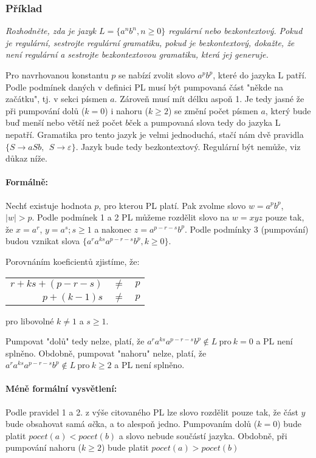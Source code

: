 \documentclass{article}
\begin{document}
\subsubsection{Příklad}
\emph{Rozhodněte, zda je jazyk $L = \{a^nb^n, n\geq0 \}$ regulární nebo bezkontextový.
Pokud je regulární, sestrojte regulární gramatiku, pokud je bezkontextový, dokažte, že není regulární a sestrojte bezkontextovou gramatiku, která jej generuje.}

Pro navrhovanou konstantu $p$ se nabízí zvolit slovo $a^pb^p$, které do jazyka L patří.
Podle podmínek daných v definici PL musí být pumpovaná část "někde na začátku", tj. v sekci písmen $a$.
Zároveň musí mít délku aspoň 1.
Je tedy jasné že při pumpování dolů ($k=0$) i nahoru ($k \geq 2$) se změní počet písmen $a$, který bude buď menší nebo větší než počet $b$ček a pumpovaná slova tedy do jazyka L nepatří.
Gramatika pro tento jazyk je velmi jednoduchá, stačí nám dvě pravidla $\{S \rightarrow aSb,~~ S \rightarrow \varepsilon\}$.
Jazyk bude tedy bezkontextový. Regulární být nemůže, viz důkaz níže.

\paragraph{Formálně:}

Nechť existuje hodnota $p$, pro kterou PL platí.
Pak zvolme slovo $w = a^pb^p$, $|w| > p$.
Podle podmínek 1 a 2 PL můžeme rozdělit slovo na $w = xyz$ pouze tak, že $x=a^r$, $y = a^s; s \geq 1$ a nakonec $z=a^{p-r-s}b^{p}$.
Podle podmínky 3 (pumpování) budou vznikat slova $\{a^ra^{ks}a^{p-r-s}b^{p}, k\geq 0\}$.

Porovnáním koeficientů zjistíme, že:

\begin{tabular}{rcl}
$r+ks+(p-r-s)$  &  $\neq$  &  $p$\\
$p + (k-1)s$  &  $\neq$  &  $p$\\
\end{tabular}   pro libovolné $k \neq 1$ a $s \geq 1$.

Pumpovat "dolů" tedy nelze, platí, že $a^ra^{ks}a^{p-r-s}b^{p} \notin L \ \text{pro}\ k=0$ a PL není splněno.
Obdobně, pumpovat "nahoru" nelze, platí, že $a^ra^{ks}a^{p-r-s}b^{p} \notin L \ \text{pro}\ k\geq2$ a PL není splněno.

\paragraph{Méně formální vysvětlení:}
Podle pravidel 1 a 2. z výše citovaného PL lze slovo rozdělit pouze tak, že část $y$ bude obsahovat samá $a$čka, a to alespoň jedno.
Pumpovaním dolů ($k = 0$) bude platit $pocet(a) < pocet(b)$ a slovo nebude součástí jazyka. Obdobně, při pumpování nahoru ($k \geq 2$) bude platit $pocet(a) > pocet(b)$
\end{document}
